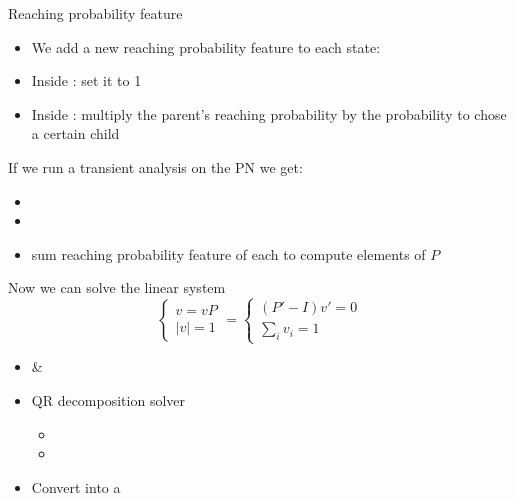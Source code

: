 \begin{frame}
  \begin{block}{Reaching probability feature}
    \begin{itemize}
    \item We add a new \alert{reaching probability feature} to each
      state: 
    \item Inside : set it to
      1
    \item Inside : multiply the
      parent's reaching probability by the probability to chose a
      certain child
    \end{itemize}
  \end{block}
  If we run a transient analysis on the \acf{PN} we get:
  \begin{itemize}
  \item {}
  \item {\scriptsize{}}
  \item sum reaching probability feature of each  to compute
    elements of \alert{$P$}
  \end{itemize}
\end{frame}

\begin{frame}
  Now we can solve the linear system
  \begin{equation*}
    \begin{cases}
      v=vP\\
      |v| = 1
    \end{cases}
    =
    \begin{cases}
      (P'-I)v'=0\\
      \sum_i v_i = 1
    \end{cases}
  \end{equation*}
  \begin{itemize}
  \item {} \& 
  \item QR decomposition solver
    \begin{itemize}\tiny
    \item {}
    \item {}
    \end{itemize}
  \item Convert  into a 
  \end{itemize}
\end{frame}


